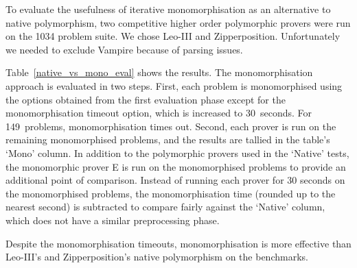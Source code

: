 \documentclass[runningheads]{llncs}
\begin{document}
To evaluate the usefulness of iterative monomorphisation as an alternative to native polymorphism, two competitive higher order polymorphic provers were run on the 1034 problem suite. We chose Leo-III and Zipperposition. Unfortunately we needed to exclude Vampire because of parsing issues.

Table~\ref{native_vs_mono_eval} shows the results.
The monomorphisation approach is evaluated in two steps. First, each problem is monomorphised using the options obtained from the first evaluation phase except for the monomorphisation timeout option, which is increased to 30~seconds. For 149~problems, monomorphisation times out. Second, each prover is run on the remaining monomorphised problems, and the results are tallied in the table's `Mono' column. In addition to the polymorphic provers used in the `Native' tests, the monomorphic prover E is run on the monomorphised problems to provide an additional point of comparison. Instead of running each prover for 30 seconds on the monomorphised problems, the monomorphisation time (rounded up to the nearest second) is subtracted to compare fairly against the `Native' column, which does not have a similar preprocessing phase.

Despite the monomorphisation timeouts, monomorphisation is more effective than Leo-III's and Zipperposition's native polymorphism on the benchmarks.


%
%
%    
\end{document}
